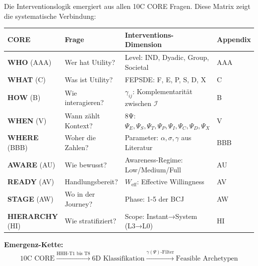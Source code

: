 \begin{tcolorbox}[colback=purple!5!white, colframe=purple!75!black,
    title=\textbf{10C CORE Integration Matrix}]

Die Interventionslogik emergiert aus allen 10C CORE Fragen. Diese Matrix zeigt die systematische Verbindung:

\begin{center}
\renewcommand{\arraystretch}{1.3}
\footnotesize
\begin{tabular}{@{}llll@{}}
\toprule
\textbf{CORE} & \textbf{Frage} & \textbf{Interventions-Dimension} & \textbf{Appendix} \\
\midrule
\textbf{WHO} (AAA) & Wer hat Utility? & Level: IND, Dyadic, Group, Societal & AAA \\
\textbf{WHAT} (C) & Was ist Utility? & FEPSDE: F, E, P, S, D, X & C \\
\textbf{HOW} (B) & Wie interagieren? & $\gamma_{ij}$: Komplementarität zwischen $\mathcal{I}$ & B \\
\textbf{WHEN} (V) & Wann zählt Kontext? & 8Ψ: $\Psi_E, \Psi_S, \Psi_T, \Psi_P, \Psi_I, \Psi_C, \Psi_D, \Psi_X$ & V \\
\textbf{WHERE} (BBB) & Woher die Zahlen? & Parameter: $\alpha, \sigma, \gamma$ aus Literatur & BBB \\
\textbf{AWARE} (AU) & Wie bewusst? & Awareness-Regime: Low/Medium/Full & AU \\
\textbf{READY} (AV) & Handlungsbereit? & $W_{\text{eff}}$: Effective Willingness & AV \\
\textbf{STAGE} (AW) & Wo in der Journey? & Phase: 1-5 der BCJ & AW \\
\textbf{HIERARCHY} (HI) & Wie stratifiziert? & Scope: Instant→System (L3→L0) & HI \\
\bottomrule
\end{tabular}
\end{center}

\textbf{Emergenz-Kette:}
\begin{equation}
\text{10C CORE} \xrightarrow{\text{HHH-T1 bis T8}} \text{6D Klassifikation} \xrightarrow{\gamma(\Psi)\text{-Filter}} \text{Feasible Archetypen}
\end{equation}

\end{tcolorbox}

